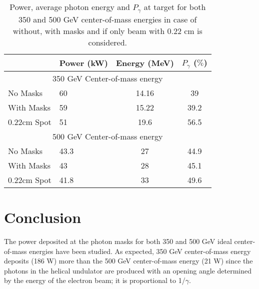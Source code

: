 \documentclass[a4paper]{article}
\begin{document}
\begin{table}[h]

	\setlength\tabcolsep{5.0pt}

	\centering
	\caption{Power, average photon energy and $P_\gamma$ at target for both 350 and 500 GeV center-of-mass energies in case of without, with masks and if only beam with 0.22 cm is considered.}
	\label{tab:styles}
	\begin{tabular}{llcc}

		\bottomrule

		{} & { Power (kW)}               & {Energy (MeV)}  & {$P_\gamma$ ($\%$)} \\
\bottomrule
\multicolumn{4}{c}{350 GeV Center-of-mass energy} \\
 \midrule

		{No Masks}  &        60         &     14.16 & 39  \\
		{With Masks}  &    59   &           15.22     &  39.2    \\
              {0.22cm Spot}  &      51    &      19.6           & 56.5    \\

 \midrule
\multicolumn{4}{c}{500 GeV Center-of-mass energy} \\
 \midrule


		{No Masks}  &          43.3       &  27   & 44.9  \\
		{With Masks}  &   43    &            28     &   45.1   \\
              {0.22cm Spot}  &     41.8     &       33          &    49.6  \\

		\bottomrule   %
	\end{tabular}
 \label{tab:FLUKAResultsAtTheTarget}
\end{table}










\section{Conclusion}

The power deposited at the photon masks for both 350 and 500 GeV ideal center-of-mass energies have been studied. As expected, 350 GeV center-of-mass energy deposits (186 W) more than the 500 GeV center-of-mass energy (21 W) since the photons in the helical undulator are produced with an opening angle determined by the energy of the electron beam; it is proportional to 1/$\gamma$.
\end{document}
